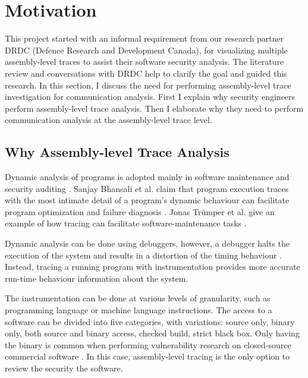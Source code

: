 \section{Motivation}
This project started with an informal requirement from our research partner DRDC (Defence Research and Development Canada), for visualizing multiple assembly-level traces to assist their software security analysis. The literature review and conversations with DRDC help to clarify the goal and guided this research. In this section, I discuss the need for performing assembly-level trace investigation for communication analysis. First I explain why security engineers perform assembly-level trace analysis. Then I elaborate why they need to perform communication analysis at the assembly-level trace level. 

\subsection{Why Assembly-level Trace Analysis}
Dynamic analysis of programs is adopted mainly in software maintenance and security auditing \cite{zhang2010detecting, cai2016sworddta, somorovsky2016systematic}. Sanjay Bhansali et al. claim that program execution traces with the most intimate detail of a program's dynamic behaviour can facilitate program optimization and failure diagnosis \cite{bhansali2006framework}. Jonas Tr{\"u}mper et al. give an example of how tracing can facilitate software-maintenance tasks \cite{trumper2012maintenance}.

Dynamic analysis can be done using debuggers, however, a debugger halts the execution of the system and results in a distortion of the timing behaviour \cite{trumper2012maintenance}. Instead, tracing a running program with instrumentation provides more accurate run-time behaviour information about the system. 

The instrumentation can be done at various levels of granularity, such as programming language or machine language instructions. The access to a software can be divided into five categories, with variations: source only, binary only, both source and binary access, checked build, strict black box. Only having the binary is common when performing vulnerability research on closed-source commercial software \cite{dowd_art_2006}. In this case, assembly-level tracing is the only option to review the security the software.

